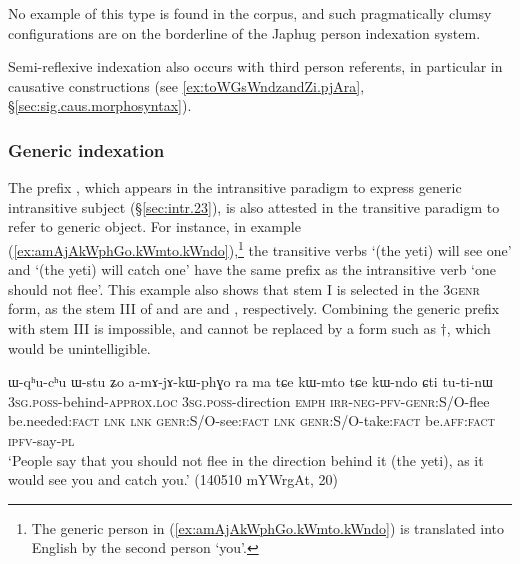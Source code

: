No example of this type is found in the corpus, and  such pragmatically clumsy configurations are on the borderline of the  Japhug person indexation system.

Semi-reflexive indexation also occurs with third person referents, in particular in causative constructions (see \ref{ex:toWGsWndzandZi.pjAra}, §\ref{sec:sig.caus.morphosyntax}).
 
\subsubsection{Generic indexation} \label{sec:indexation.generic.tr}
The prefix , which appears in the intransitive paradigm to express generic intransitive subject (§\ref{sec:intr.23}), is also attested in the transitive paradigm to refer to generic object. For instance, in example (\ref{ex:amAjAkWphGo.kWmto.kWndo}),\footnote{The generic person in (\ref{ex:amAjAkWphGo.kWmto.kWndo}) is translated into English by the second person `you'. } the transitive verbs  `(the yeti) will see one' and  `(the yeti) will catch one' have the same  prefix as the intransitive verb  `one should not flee'. This example also shows that stem I is selected in the 3\fl{}\textsc{genr} form, as the stem III of  and  are  and , respectively. Combining the generic  prefix with stem III is impossible, and  cannot be replaced by a form such as $\dagger$, which would be unintelligible.

\begin{exe}
\ex   \label{ex:amAjAkWphGo.kWmto.kWndo}
\gll ɯ-qʰu-cʰu ɯ-stu ʑo a-mɤ-jɤ-kɯ-phɣo ra ma tɕe kɯ-mto tɕe kɯ-ndo ɕti tu-ti-nɯ \\
\textsc{3sg}.\textsc{poss}-behind-\textsc{approx}.\textsc{loc}  \textsc{3sg}.\textsc{poss}-direction \textsc{emph} \textsc{irr}-\textsc{neg}-\textsc{pfv}-\textsc{genr}:S/O-flee be.needed:\textsc{fact} \textsc{lnk} \textsc{lnk}
\textsc{genr}:S/O-see:\textsc{fact} \textsc{lnk} \textsc{genr}:S/O-take:\textsc{fact} be.\textsc{aff}:\textsc{fact} \textsc{ipfv}-say-\textsc{pl} \\
\glt `People say that you should not flee in the direction behind it (the yeti), as it would see you and catch you.' (140510 mYWrgAt, 20)
\end{exe}

